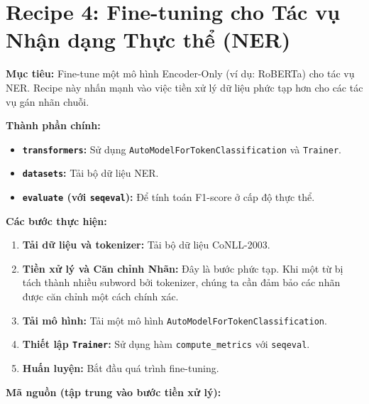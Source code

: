 
\section{Recipe 4: Fine-tuning cho Tác vụ Nhận dạng Thực thể (NER)}
\label{sec:recipe_ner_finetuning}

\textbf{Mục tiêu:} Fine-tune một mô hình Encoder-Only (ví dụ: RoBERTa) cho tác vụ NER. Recipe này nhấn mạnh vào việc tiền xử lý dữ liệu phức tạp hơn cho các tác vụ gán nhãn chuỗi.

\textbf{Thành phần chính:}
\begin{itemize}
    \item \textbf{\texttt{transformers}:} Sử dụng \texttt{AutoModelForTokenClassification} và \texttt{Trainer}.
    \item \textbf{\texttt{datasets}:} Tải bộ dữ liệu NER.
    \item \textbf{\texttt{evaluate} (với \texttt{seqeval}):} Để tính toán F1-score ở cấp độ thực thể.
\end{itemize}

\textbf{Các bước thực hiện:}
\begin{enumerate}
    \item \textbf{Tải dữ liệu và tokenizer:} Tải bộ dữ liệu CoNLL-2003.
    \item \textbf{Tiền xử lý và Căn chỉnh Nhãn:} Đây là bước phức tạp. Khi một từ bị tách thành nhiều subword bởi tokenizer, chúng ta cần đảm bảo các nhãn được căn chỉnh một cách chính xác.
    \item \textbf{Tải mô hình:} Tải một mô hình \texttt{AutoModelForTokenClassification}.
    \item \textbf{Thiết lập \texttt{Trainer}:} Sử dụng hàm \texttt{compute\_metrics} với \texttt{seqeval}.
    \item \textbf{Huấn luyện:} Bắt đầu quá trình fine-tuning.
\end{enumerate}


\textbf{Mã nguồn (tập trung vào bước tiền xử lý):}

